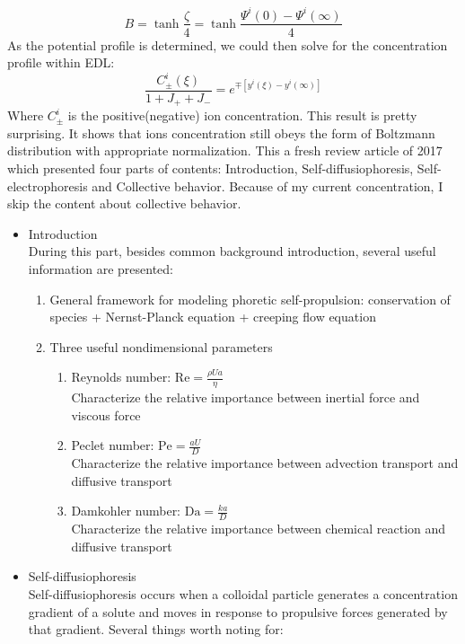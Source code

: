 \documentclass[fontsize=11pt, %
                             paper=a4, %
                             twoside, %
                             captions=tableheading,
                             index=totoc,
                             hyperref]{labbook}
\begin{document}
\begin{addmargin}[4cm]{0cm}
\begin{equation}
\end{equation}
\begin{equation}
B=\tanh \frac{\zeta}{4}=\tanh \frac{\Psi^i(0)-\Psi^i(\infty)}{4}
\end{equation}
As the potential profile is determined, we could then solve for the concentration profile within EDL:
\begin{equation}
\frac{C^i_{\pm}(\xi)}{1+J_++J_-}=e^{\mp\left[y^i(\xi)-y^i(\infty)\right]}
\end{equation}
Where $C^i_\pm$ is the positive(negative) ion concentration. This result is pretty surprising. It shows that ions concentration still obeys the form of Boltzmann distribution with appropriate normalization.
This a fresh review article of 2017 which presented four parts of contents: Introduction, Self-diffusiophoresis, Self-electrophoresis and Collective behavior. Because of my current concentration, I skip the content about collective behavior. 
\begin{itemize}
\item Introduction\\
During this part, besides common background introduction, several useful information are presented:
\begin{enumerate}
\item
General framework for modeling phoretic self-propulsion: conservation of species + Nernst-Planck equation + creeping flow equation
\item 
Three useful nondimensional parameters
\begin{enumerate}
\item
Reynolds number: $\mathrm{Re}=\frac{\rho U a}{\eta}$\\
Characterize the relative importance between inertial force and viscous force
\item
Peclet number: $\mathrm{Pe}=\frac{aU}{D}$\\
Characterize the relative importance between advection transport and diffusive transport
\item
Damkohler number: $\mathrm{Da}=\frac{ka}{D}$\\
Characterize the relative importance between chemical reaction and diffusive transport
\end{enumerate}
\end{enumerate}
\item Self-diffusiophoresis\\
Self-diffusiophoresis occurs when a colloidal particle generates a concentration gradient of a solute and moves in response to propulsive forces generated by that gradient. Several things worth noting for:

\end{itemize}
\end{addmargin}
\end{document}
